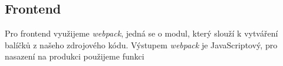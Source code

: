 \subsection{Frontend}

Pro frontend využijeme \textit{webpack}, jedná se o modul, který slouží k vytváření balíčků z našeho zdrojového kódu. Výstupem
\textit{webpack} je JavaScriptový, pro nasazení na produkci použijeme funkci